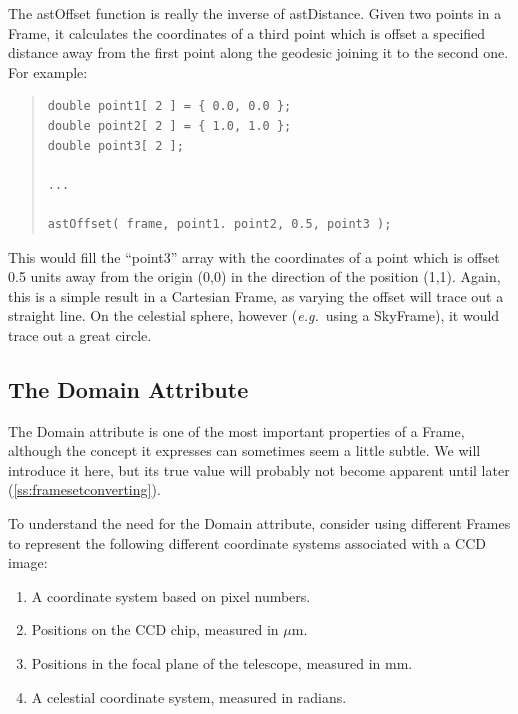 \documentclass[twoside,11pt]{article}
\newcommand{\htmlref}[2]{#1}
\newcommand{\secref}[1]{\S\ref{#1}}
\renewcommand{\secref}[1]{\ref{#1}}
\begin{document}
The \htmlref{astOffset}{astOffset} function is really the inverse of astDistance. Given two
points in a Frame, it calculates the coordinates of a third point
which is offset a specified distance away from the first point along
the geodesic joining it to the second one. For example:

\begin{quote}
\small
\begin{verbatim}
double point1[ 2 ] = { 0.0, 0.0 };
double point2[ 2 ] = { 1.0, 1.0 };
double point3[ 2 ];

...

astOffset( frame, point1. point2, 0.5, point3 );
\end{verbatim}
\normalsize
\end{quote}

This would fill the ``point3'' array with the coordinates of a point
which is offset 0.5 units away from the origin (0,0) in the direction
of the position (1,1). Again, this is a simple result in a Cartesian
Frame, as varying the offset will trace out a straight line. On the
celestial sphere, however ({\em{e.g.}}\ using a SkyFrame), it would
trace out a great circle.

\subsection{\label{ss:framedomains}The Domain Attribute}

The \htmlref{Domain}{Domain} attribute is one of the most important properties of a
\htmlref{Frame}{Frame}, although the concept it expresses can sometimes seem a little
subtle.  We will introduce it here, but its true value will probably
not become apparent until later (\secref{ss:framesetconverting}).

To understand the need for the Domain attribute, consider using
different Frames to represent the following different coordinate
systems associated with a CCD image:

\begin{enumerate}
\item A coordinate system based on pixel numbers.

\item Positions on the CCD chip, measured in $\mu$m.

\item Positions in the focal plane of the telescope, measured in mm.

\item A celestial coordinate system, measured in radians.
\end{enumerate}
\end{document}

